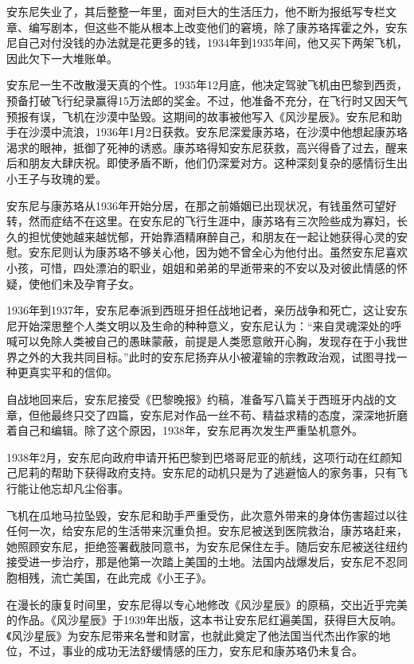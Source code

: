 安东尼失业了，其后整整一年里，面对巨大的生活压力，他不断为报纸写专栏文章、编写剧本，但这些不能从根本上改变他们的窘境，除了康苏珞挥霍之外，安东尼自己对付没钱的办法就是花更多的钱，1934年到1935年间，他又买下两架飞机，因此欠下一大堆账单。

安东尼一生不改散漫天真的个性。1935年12月底，他决定驾驶飞机由巴黎到西贡，预备打破飞行纪录赢得15万法郎的奖金。不过，他准备不充分，在飞行时又因天气预报有误，飞机在沙漠中坠毁。这期间的故事被他写入《风沙星辰》。安东尼和助手在沙漠中流浪，1936年1月2日获救。安东尼深爱康苏珞，在沙漠中他想起康苏珞渴求的眼神，抵御了死神的诱惑。康苏珞得知安东尼获救，高兴得昏了过去，醒来后和朋友大肆庆祝。即使矛盾不断，他们仍深爱对方。这种深刻复杂的感情衍生出小王子与玫瑰的爱。

安东尼与康苏珞从1936年开始分居，在那之前婚姻已出现状况，有钱虽然可望好转，然而症结不在这里。在安东尼的飞行生涯中，康苏珞有三次险些成为寡妇，长久的担忧使她越来越忧郁，开始靠酒精麻醉自己，和朋友在一起让她获得心灵的安慰。安东尼则认为康苏珞不够关心他，因为她不曾全心为他付出。虽然安东尼喜欢小孩，可惜，四处漂泊的职业，姐姐和弟弟的早逝带来的不安以及对彼此情感的怀疑，使他们未及孕育子女。


\stoptitle

\starttitle[title={12}]

1936年到1937年，安东尼奉派到西班牙担任战地记者，亲历战争和死亡，这让安东尼开始深思整个人类文明以及生命的种种意义，安东尼认为：“来自灵魂深处的呼喊可以免除人类被自己的愚昧蒙蔽，前提是人类愿意敞开心胸，发现存在于小我世界之外的大我共同目标。”此时的安东尼扬弃从小被灌输的宗教政治观，试图寻找一种更真实平和的信仰。

自战地回来后，安东尼接受《巴黎晚报》约稿，准备写八篇关于西班牙内战的文章，但他最终只交了四篇，安东尼对作品一丝不苟、精益求精的态度，深深地折磨着自己和编辑。除了这个原因，1938年，安东尼再次发生严重坠机意外。

1938年2月，安东尼向政府申请开拓巴黎到巴塔哥尼亚的航线，这项行动在红颜知己尼莉的帮助下获得政府支持。安东尼的动机只是为了逃避恼人的家务事，只有飞行能让他忘却凡尘俗事。

飞机在瓜地马拉坠毁，安东尼和助手严重受伤，此次意外带来的身体伤害超过以往任何一次，给安东尼的生活带来沉重负担。安东尼被送到医院救治，康苏珞赶来，她照顾安东尼，拒绝签署截肢同意书，为安东尼保住左手。随后安东尼被送往纽约接受进一步治疗，那是他第一次踏上美国的土地。法国内战爆发后，安东尼不忍同胞相残，流亡美国，在此完成《小王子》。

在漫长的康复时间里，安东尼得以专心地修改《风沙星辰》的原稿，交出近乎完美的作品。《风沙星辰》于1939年出版，这本书让安东尼红遍美国，获得巨大反响。《风沙星辰》为安东尼带来名誉和财富，也就此奠定了他法国当代杰出作家的地位，不过，事业的成功无法舒缓情感的压力，安东尼和康苏珞仍未复合。

